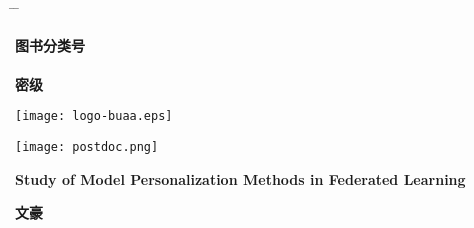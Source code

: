 \thispagestyle{empty}\setcounter{page}{0}

\begin{tabbing}
 \hspace*{0cm} \= \hspace{2.7cm} \= \kill

\underline{\hspace{0.85cm}{\sihao 10006}\hspace{0.85cm}}  \hskip4.1cm
  {\sihao\textbf{图书分类号  }}\underline{\hspace{0.6cm}{\sihao O413}\hspace{0.7cm}}\\ %
  \\
\underline{\hspace{0.85cm}{\sihao B21037}\hspace{0.55cm}}  \hskip4.05cm
  {\sihao\textbf{密\phantom{书分类}级 
 }}\underline{\hspace{2.4cm}}
\end{tabbing}

\vspace{1.2cm}

\begin{center}
 \texttt{[image: logo-buaa.eps]}
\end{center}

\vspace{0.15cm}

\begin{center}
\texttt{[image: postdoc.png]}
\end{center}

\vspace{0.15cm}

\begin{center}
{\erhao{}}
\end{center}

\vspace{0.05cm}

\begin{spacing}{2}
\begin{center}{\erhao\bf
Study of Model Personalization Methods in Federated Learning}
\end{center}
\end{spacing}

\vspace{0.05cm}

\begin{center}
{\xiaoerhao\song\boldmath\bf 文豪}
\end{center}

